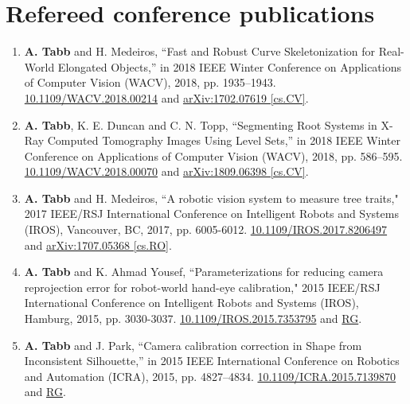 \documentclass[letterpaper,11pt]{article}
\begin{document}
\section{Refereed conference publications}
\begin{enumerate}[noitemsep, leftmargin=*,resume*]
\item{\textbf{A. Tabb} and H. Medeiros, ``Fast and Robust Curve Skeletonization for Real-World Elongated Objects,” in 2018 IEEE Winter Conference on Applications of Computer Vision (WACV), 2018, pp. 1935–1943.
\href{https://doi.org/10.1109/WACV.2018.00214}{10.1109/WACV.2018.00214} and \href{https://arxiv.org/abs/1702.07619}{arXiv:1702.07619 [cs.CV]}.}

\item{\textbf{A. Tabb}, K. E. Duncan and C. N. Topp, ``Segmenting Root Systems in X-Ray Computed Tomography Images Using Level Sets,” in 2018 IEEE Winter Conference on Applications of Computer Vision (WACV), 2018, pp. 586–595. \href{https://doi.org/10.1109/WACV.2018.00070}{10.1109/WACV.2018.00070} and \href{https://arxiv.org/abs/1809.06398}{arXiv:1809.06398 [cs.CV]}.}

\item{\textbf{A. Tabb} and H. Medeiros, ``A robotic vision system to measure tree traits," 2017 IEEE/RSJ International Conference on Intelligent Robots and Systems (IROS), Vancouver, BC, 2017, pp. 6005-6012. \href{https://doi.org/10.1109/IROS.2017.8206497}{10.1109/IROS.2017.8206497} and \href{https://arxiv.org/abs/1707.05368}{arXiv:1707.05368 [cs.RO]}.}

\item{\textbf{A. Tabb} and K. Ahmad Yousef, ``Parameterizations for reducing camera reprojection error for robot-world hand-eye calibration," 2015 IEEE/RSJ International Conference on Intelligent Robots and Systems (IROS), Hamburg, 2015, pp. 3030-3037. \href{https://doi.org/10.1109/IROS.2015.7353795}{10.1109/IROS.2015.7353795} and \href{https://www.researchgate.net/publication/280925717_Parameterizations_for_Reducing_Camera_Reprojection_Error_for_Robot-World_Hand-Eye_Calibration}{RG}.}

\item{\textbf{A. Tabb} and J. Park, ``Camera calibration correction in Shape from Inconsistent Silhouette,” in 2015 IEEE International Conference on Robotics and Automation (ICRA), 2015, pp. 4827–4834. \href{https://doi.org/10.1109/ICRA.2015.7139870}{10.1109/ICRA.2015.7139870} and \href{https://www.researchgate.net/publication/282710124_Camera_calibration_correction_in_Shape_from_Inconsistent_Silhouette}{RG}.}


\end{enumerate}
\end{document}
